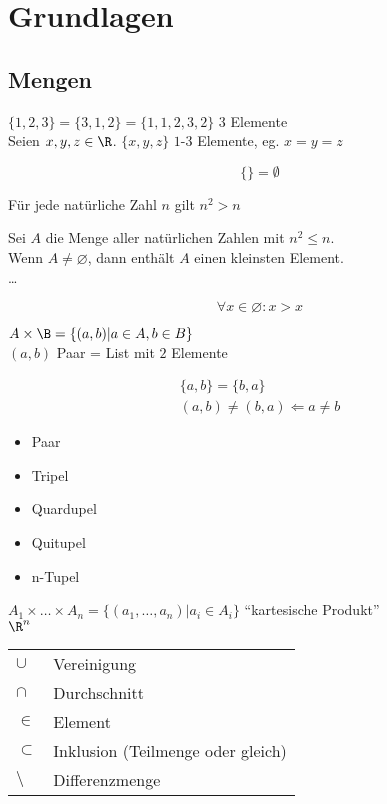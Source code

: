 \chapter{Grundlagen}
\section{Mengen}
\begin{bsp*}
	$\{1,2,3\} = \{3,1,2\} = \{1,1,2,3,2\}$ \qquad $3$ Elemente\\
	Seien $x, y, z \in \R$. $\{x,y,z\}$ \qquad $1$-$3$ Elemente, eg. $x = y = z$
\end{bsp*}

\[ \{\} = \emptyset \]

\begin{bsp*}
	Für jede natürliche Zahl $n$ gilt $n^2 > n$\\
	\begin{bew}
		Sei $A$ die Menge aller natürlichen Zahlen mit $n^2 \leq n$.\\
		Wenn $A \neq \varnothing$, dann enthält $A$ einen kleinsten Element.\\
		\dots
	\end{bew}
\end{bsp*}

\[ \forall x \in \varnothing : x > x \]

$A \times \B = \{ (a,b) | a \in A, b \in B \}$\\
$(a,b)$ Paar = List mit $2$ Elemente

\begin{gather*}
	\{a,b\} = \{b,a\} \\
	(a,b) \neq (b,a) \Leftarrow a \neq b
\end{gather*}

\begin{itemize}
	\item Paar
	\item Tripel
	\item Quardupel
	\item Quitupel
	\item n-Tupel
\end{itemize}

$A_1 \times \dots \times A_n = \{ (a_1 , \dotsc , a_n ) | a_i \in A_i \}$ \enquote{kartesische Produkt} \\
$\R^n$\\

\begin{tabular}{ll}
	$\cup$		&Vereinigung					\\
	$\cap$		&Durchschnitt					\\
	$\in$			&Element						\\
	$\subset$		&Inklusion (Teilmenge oder gleich)	\\
	$\setminus$	&Differenzmenge				
\end{tabular}

